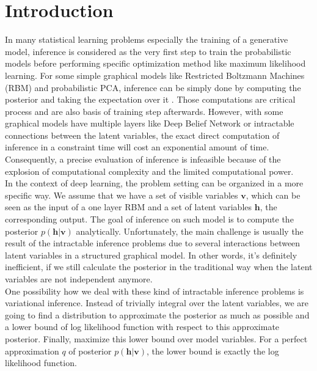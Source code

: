 \documentclass[conference]{IEEEtran}
\begin{document}
%
\IEEEpeerreviewmaketitle



\section{Introduction}
In many statistical learning problems especially the training of a generative model, inference is considered as the very first step to train the probabilistic models before performing specific optimization method like maximum likelihood learning.  For some simple graphical models like Restricted Boltzmann Machines (RBM) and probabilistic PCA, inference can be simply done by computing the posterior and taking the expectation over it \cite{Goodfellow-et-al-2016}. Those computations are critical process and are also basis of training step afterwards. However, with some graphical models have multiple layers like Deep Belief Network or intractable connections between the latent variables, the exact direct computation of inference in a constraint time will cost  an exponential amount of time. Consequently, a precise evaluation of inference is infeasible because of the explosion of computational complexity and the limited computational power.\\

In the context of deep learning, the problem setting can be organized in a more specific way. We assume that we have a set of visible variables $\boldsymbol{v}$, which can be seen as the input of a one layer RBM and a set of latent variables $\boldsymbol{h}$, the corresponding output. The goal of inference on such model is to compute the posterior $p(\boldsymbol{h} | \boldsymbol{v})$ analytically. Unfortunately, the main challenge is usually the result of the intractable inference problems due to several interactions between latent variables in a structured graphical model. In other words, it's definitely inefficient, if we still calculate the posterior in the traditional way when the latent variables are not independent anymore.\\

One possibility how we deal with these kind of intractable inference problems is variational inference. Instead of trivially integral over the latent variables, we are going to find a distribution to approximate the posterior as much as possible and a lower bound of log likelihood function with respect to this approximate posterior. Finally, maximize this lower bound over model variables. For a perfect approximation $q$ of posterior $p(\boldsymbol{h} | \boldsymbol{v})$, the lower bound is exactly the log likelihood function.\\
\end{document}
